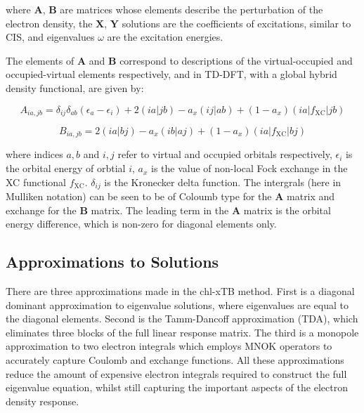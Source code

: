 where $\mathbf{A}$, $\mathbf{B}$ are matrices whose elements describe the perturbation
of the electron density, the $\mathbf{X}$, $\mathbf{Y}$ solutions are the 
coefficients of excitations, similar to CIS, and eigenvalues $\omega$ are the 
excitation energies.

The elements of $\mathbf{A}$ and $\mathbf{B}$ correspond to descriptions of the
virtual-occupied and occupied-virtual elements respectively, and in TD-DFT, with a 
global hybrid density functional, are given by:

\begin{equation}
A_{ia,jb} = \delta_{ij} \delta_{ab} \left( \epsilon_a - \epsilon_i \right) + 2\left(ia|jb\right) - a_x\left(ij|ab\right) + (1- a_x)\left(ia|f_{\text{XC}}|jb\right)
\end{equation}

\begin{equation}
B_{ia,jb} = 2\left(ia|bj\right) - a_x\left(ib|aj\right) + (1- a_x)\left(ia|f_{\text{XC}}|bj\right)
\end{equation}

where indices $a,b$ and $i,j$ refer to virtual and occupied orbitals respectively,
$\epsilon_i$ is the orbital energy of orbtial $i$, $a_x$ is the value of non-local
Fock exchange in the XC functional $f_{\text{XC}}$. $\delta_{ij}$ is the Kronecker
delta function. The intergrals (here in Mulliken notation) can be seen to be of
Coloumb type for the $\mathbf{A}$ matrix and exchange for the $\mathbf{B}$ matrix. 
The leading term in the $\mathbf{A}$ matrix is the orbital energy difference,
which is non-zero for diagonal elements only.

\subsection{Approximations to Solutions}
\label{subsec:chl_approxs}

There are three approximations made in the chl-xTB method. First is a diagonal dominant
approximation to eigenvalue solutions, where eigenvalues are equal to the diagonal
elements. Second is the Tamm-Dancoff approximation (TDA), which eliminates three
blocks of the full linear response matrix. The third is a monopole approximation
to two electron integrals which employs MNOK operators to accurately capture Coulomb
and exchange functions. All these approximations reduce the amount of expensive
electron integrals required to construct the full eigenvalue equation, whilst still
capturing the important aspects of the electron density response.


